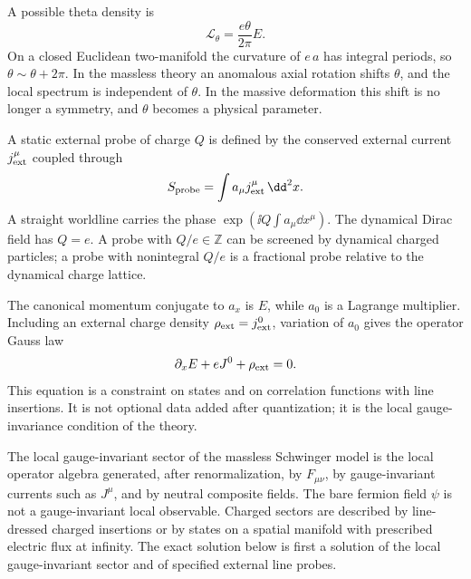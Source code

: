 A possible theta density is
\begin{equation}
  \mathcal L_\theta=\frac{e\theta}{2\pi}E .
  \label{eq:schwinger-theta-density}
\end{equation}
On a closed Euclidean two-manifold the curvature of \(e\,a\) has integral
periods, so \(\theta\sim\theta+2\pi\).  In the massless theory an anomalous
axial rotation shifts \(\theta\), and the local spectrum is independent of
\(\theta\).  In the massive deformation this shift is no longer a symmetry,
and \(\theta\) becomes a physical parameter.

\begin{definition}
\label{def:schwinger-probe-charge-convention}
  A static external probe of charge \(Q\) is defined by the conserved
  external current \(j^\mu_{\rm ext}\) coupled through
  \[
    S_{\rm probe}=\int a_\mu j^\mu_{\rm ext}\,\dd^2x .
  \]
  A straight worldline carries the phase
  \(\exp(\ii Q\int a_\mu\dd x^\mu)\).  The dynamical Dirac field has
  \(Q=e\).  A probe with \(Q/e\in\mathbb Z\) can be screened by dynamical
  charged particles; a probe with nonintegral \(Q/e\) is a fractional probe
  relative to the dynamical charge lattice.
\end{definition}

The canonical momentum conjugate to \(a_x\) is \(E\), while \(a_0\) is a
Lagrange multiplier.  Including an external charge density
\(\rho_{\rm ext}=j^0_{\rm ext}\), variation of \(a_0\) gives the operator
Gauss law
\begin{equation}
  \partial_xE+eJ^0+\rho_{\rm ext}=0 .
  \label{eq:schwinger-gauss-law}
\end{equation}
This equation is a constraint on states and on correlation functions with
line insertions.  It is not optional data added after quantization; it is the
local gauge-invariance condition of the theory.

\begin{definition}
\label{def:schwinger-local-sector}
  The local gauge-invariant sector of the massless Schwinger model is the
  local operator algebra generated, after renormalization, by \(F_{\mu\nu}\),
  by gauge-invariant currents such as \(J^\mu\), and by neutral composite
  fields.  The bare fermion field \(\psi\) is not a gauge-invariant local
  observable.  Charged sectors are described by line-dressed charged
  insertions or by states on a spatial manifold with prescribed electric
  flux at infinity.  The exact solution below is first a solution of the
  local gauge-invariant sector and of specified external line probes.
\end{definition}

